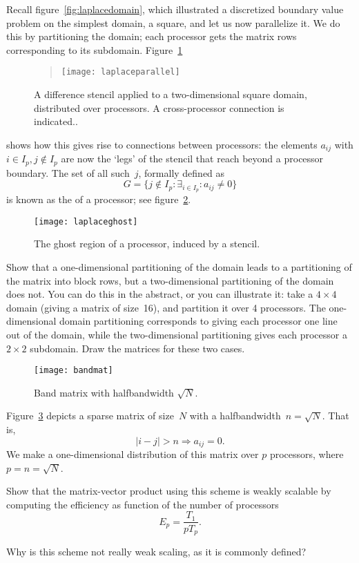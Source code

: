 Recall figure~\ref{fig:laplacedomain}, which illustrated a discretized
boundary value problem on the simplest domain, a square, and let us
now parallelize it. We do this by partitioning the domain; each
processor gets the matrix rows corresponding to its subdomain.
Figure~\ref{fig:laplaceparallel}
\begin{figure}
  \begin{quote}
    \texttt{[image: laplaceparallel]}
  \end{quote}
  \caption{A difference stencil applied to a two-dimensional square
    domain, distributed over processors. A cross-processor connection
    is indicated..}
  \label{fig:laplaceparallel}
\end{figure}
shows how this gives rise to connections between processors: the
elements $a_{ij}$ with $i\in I_p,j\not\in I_p$ are now the `legs' of
the stencil that reach beyond a processor boundary. The set of all
such~$j$, formally defined as 
\[ G = \{ j\not\in I_p \colon 
    \exists_{i\in I_p}\colon a_{ij}\not=0 \}
\]
is known as the  of a processor; see
figure~\ref{fig:ghost}.
\begin{figure}
  \texttt{[image: laplaceghost]}
  \caption{The ghost region of a processor, induced by a stencil.}
  \label{fig:ghost}
\end{figure}

\begin{exercise}
  Show that a one-dimensional partitioning of the domain leads to a
  partitioning of the matrix into block rows, but a two-dimensional
  partitioning of the domain does not. You can do this in the
  abstract, or you can illustrate it: take a $4\times4$ domain (giving
  a matrix of size~16), and partition it over 4 processors. The
  one-dimensional domain partitioning corresponds to giving each
  processor one line out of the domain, while the two-dimensional
  partitioning gives each processor a $2\times2$ subdomain. Draw the
  matrices for these two cases.
\end{exercise}

\begin{figure}[ht]
  \texttt{[image: bandmat]}
  \caption{Band matrix with halfbandwidth $\sqrt N$.}
  \label{fig:bandmat}
\end{figure}

\begin{exercise}
  \label{ex:bandmat-prod}
  Figure~\ref{fig:bandmat} depicts a sparse matrix of size~$N$ with a
  halfbandwidth~$n=\sqrt N$. That is,
  \[ |i-j|>n \Rightarrow a_{ij}=0. \]
  We make a one-dimensional distribution of this matrix over $p$
  processors, where $p=n=\sqrt N$.

  Show that the matrix-vector product using
  this scheme is weakly scalable by computing the efficiency
  as function of the number of processors
  \[ E_p = \frac{T_1}{pT_p}. \]

  Why is this scheme not really weak scaling, as it is commonly defined?
\end{exercise}

